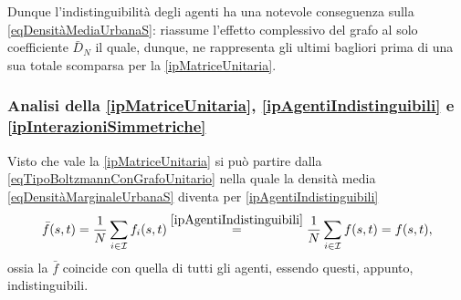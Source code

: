                 Dunque l'indistinguibilità degli agenti ha una notevole conseguenza sulla \ref{eqDensitàMediaUrbanaS}: riassume l'effetto complessivo del grafo al solo coefficiente \(\bar D_N\) il quale, dunque, ne rappresenta gli ultimi bagliori prima di una sua totale scomparsa per la \ref{ipMatriceUnitaria}.

            \subsubsection{Analisi della \texorpdfstring{\ref{ipMatriceUnitaria}, \ref{ipAgentiIndistinguibili} e \ref{ipInterazioniSimmetriche}}{S1, S2 e S3}}

                Visto che vale la \ref{ipMatriceUnitaria} si può partire dalla \eqref{eqTipoBoltzmannConGrafoUnitario} nella quale la densità media \cref{eqDensitàMarginaleUrbanaS} diventa per \ref{ipAgentiIndistinguibili}                %
                \begin{equation*}
                    \bar f(s,t)=\frac1N\sum_{i\in\mathcal I}f_i(s,t)
                    \overset{\ref{ipAgentiIndistinguibili}}=
                    \frac1N\sum_{i\in\mathcal I}f(s,t)=f(s,t),
                \end{equation*}
                ossia la \(\bar f\) coincide con quella di tutti gli agenti\footnotemark{}, essendo questi, appunto, indistinguibili.%

